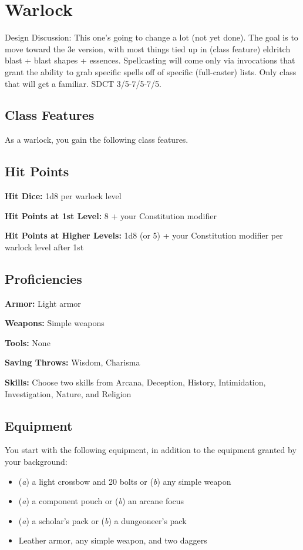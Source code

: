 \section{Warlock}\label{class:warlock}

Design Discussion: This one's going to change a lot (not yet done). The goal is to move toward the 3e version, with most things tied up in (class feature) eldritch blast + blast shapes + essences. Spellcasting will come only via invocations that grant the ability to grab specific spells off of specific (full-caster) lists. Only class that will get a familiar. SDCT 3/5-7/5-7/5.

\subsection{Class Features}

As a warlock, you gain the following class features.

\subsection{Hit Points}

\textbf{Hit Dice:} 1d8 per warlock level

\textbf{Hit Points at 1st Level:} 8 + your Constitution modifier

\textbf{Hit Points at Higher Levels:} 1d8 (or 5) + your Constitution modifier per warlock level after 1st

\subsection{Proficiencies}

\textbf{Armor:} Light armor

\textbf{Weapons:} Simple weapons

\textbf{Tools:} None

\textbf{Saving Throws:} Wisdom, Charisma

\textbf{Skills:} Choose two skills from Arcana, Deception, History, Intimidation, Investigation, Nature, and Religion

\subsection{Equipment}

You start with the following equipment, in addition to the equipment granted by your background:
\begin{itemize}
\item (\textit{a}) a light crossbow and 20 bolts or (\textit{b}) any simple weapon
\item (\textit{a}) a component pouch or (\textit{b}) an arcane focus
\item (\textit{a}) a scholar's pack or (\textit{b}) a dungeoneer's pack
\item Leather armor, any simple weapon, and two daggers
\end{itemize}

